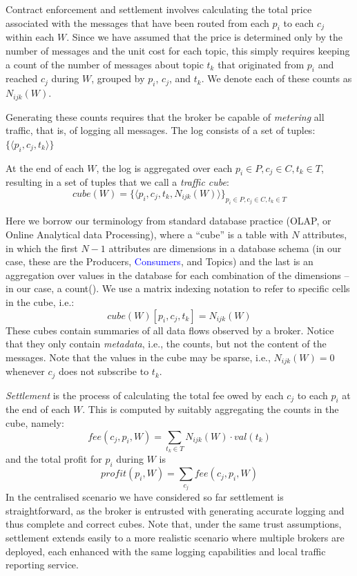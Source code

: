 \documentclass[chi_draft]{sigchi}
\begin{document}
Contract enforcement and settlement involves calculating the total price associated with the messages that have been routed from each $ p_i $ to each $ c_j $ within each $W$.
Since we have assumed that the price is  determined only by the number of messages and the unit cost for each topic, this simply requires keeping a count of the number of messages about topic $t_k$ that originated from $p_i$ and reached $c_j$ during $W$, grouped by $ p_i $, $ c_j $, and $ t_k $.
We denote each of these counts as $N_{ijk}(W)$.

Generating these counts requires that the broker be capable of \textit{metering} all traffic, that is, of logging all messages.
The log consists of a set of tuples:
$ \{\langle p_i, c_j, t_k \rangle  \} $

At the end of each $W$, the log is aggregated over each $p_i \in P, c_j \in C, t_k \in T$, resulting in a set of tuples that we call a \textit{traffic cube}:
\begin{equation}\label{eq:cube}
\mathit{cube}(W) = \{ \langle p_i, c_j, t_k, N_{ijk}(W) \rangle \}_{p_i \in P, c_j \in C, t_k \in T}
\end{equation}

Here we borrow our terminology from standard database practice (OLAP, or Online Analytical data Processing), where a  ``cube'' is a table with $ N $ attributes, in which the first $ N-1 $ attributes are  dimensions in a database schema (in our case, these are the Producers, \textcolor{blue}{Consumers}, and Topics) and the last is an aggregation over values in the database for each combination of the dimensions -- in our case, a count().
We use a matrix indexing notation to refer to specific cells in the cube, i.e.:
\[ \mathit{cube}(W)[p_i, c_j, t_k] = N_{ijk}(W) \] 
These cubes contain summaries of all data flows observed by a broker. Notice that they only contain \textit{metadata}, i.e., the counts, but not the content of the messages.
%
Note that the values in the cube may be sparse, i.e., $N_{ijk}(W) = 0$ whenever $c_j$ does not subscribe to $t_k$.

\textit{Settlement} is the process of calculating the total fee owed by each $ c_j $ to each $ p_i $ at the end of each $W$.
This is computed by suitably aggregating the counts in the cube, namely:
\begin{equation}
\mathit{fee}(c_j, p_i, W) = \sum_{t_k \in T} N_{ijk}(W) \cdot \mathit{val}(t_k)
\label{eq:balance}
\end{equation}
and the total profit for $ p_i  $ during $W$ is
\begin{equation}
\mathit{profit}(p_i, W) = \sum_{c_j} \mathit{fee}(c_j, p_i, W)
\label{eq:reward}
\end{equation}
In the centralised scenario we have considered so far settlement is straightforward, as the broker is entrusted with generating accurate logging and thus complete and correct cubes.
Note that, under the same trust assumptions, settlement extends easily to a more realistic scenario where multiple brokers are deployed, each enhanced with the same logging capabilities and local traffic reporting service.
\end{document}
